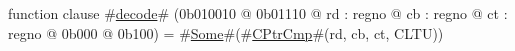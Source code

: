 function clause #\hyperref[zdecode]{decode}# (0b010010 @ 0b01110 @ rd : regno @ cb : regno @ ct : regno @ 0b000 @ 0b100) = #\hyperref[zSome]{Some}#(#\hyperref[zCPtrCmp]{CPtrCmp}#(rd, cb, ct, CLTU))
